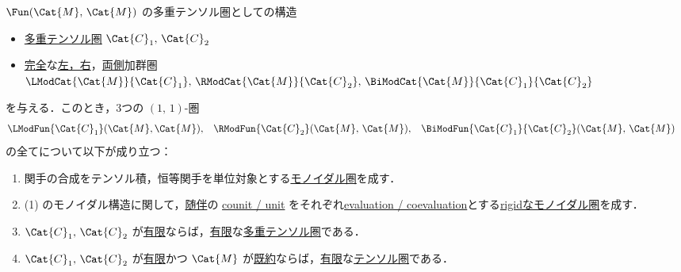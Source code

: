 \documentclass[TQFT_main]{subfiles}
\begin{document}
\begin{myprop}[label=prop:module-End]{{$\Fun(\Cat{M},\, \Cat{M})$} の多重テンソル圏としての構造}
    \begin{itemize}
        \item \hyperref[def:tensorfusion-cat]{多重テンソル圏} $\Cat{C}_1,\, \Cat{C}_2$
        \item \hyperref[def:modulecat-exact]{完全}な\hyperref[def:modulecat]{左，右}，\hyperref[def:bimodulecat]{両側}加群圏 $\LModCat{\Cat{M}}{\Cat{C}_1},\, \RModCat{\Cat{M}}{\Cat{C}_2},\, \BiModCat{\Cat{M}}{\Cat{C}_1}{\Cat{C}_2}$
    \end{itemize}
    を与える．このとき，3つの $(1,\, 1)$-圏
    \begin{align}
        &\LModFun{\Cat{C}_1} (\Cat{M}, \Cat{M}), &&\RModFun{\Cat{C}_2} (\Cat{M},\, \Cat{M}), &&\BiModFun{\Cat{C}_1}{\Cat{C}_2} (\Cat{M},\, \Cat{M})
    \end{align}
    の全てについて以下が成り立つ：
    \begin{enumerate}
        \item 関手の合成をテンソル積，恒等関手を単位対象とする\hyperref[redef:monoidal-category]{モノイダル圏}を成す．
        \item (1) のモノイダル構造に関して，\hyperref[def:adjoint]{随伴}の \hyperref[def:unit-counit-adjunction]{counit / unit} をそれぞれ\hyperref[redef:dual]{evaluation / coevaluation}とする\hyperref[redef:rigid]{rigidなモノイダル圏}を成す．
        \item $\Cat{C}_1,\, \Cat{C}_2$ が\hyperref[def:finite-abcat]{有限}ならば，\hyperref[def:finite-abcat]{有限}な\hyperref[def:tensorfusion-cat]{多重テンソル圏}である．
        \item $\Cat{C}_1,\, \Cat{C}_2$ が\hyperref[def:finite-abcat]{有限}かつ $\Cat{M}$ が\hyperref[def:modulecat-indecomposable]{既約}ならば，\hyperref[def:finite-abcat]{有限}な\hyperref[def:tensorfusion-cat]{テンソル圏}である．
    \end{enumerate}
\end{myprop}
\end{document}
